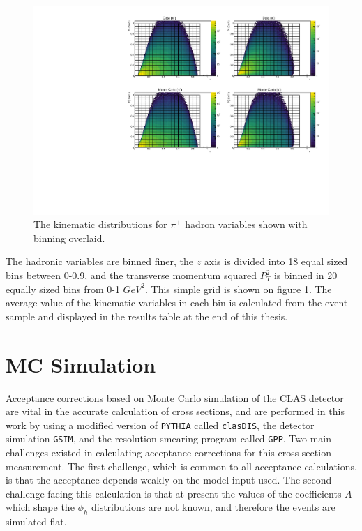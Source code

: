 \begin{figure}
  \centering
  \includegraphics[width=\textwidth]{image/plots/sidis/zpt.pdf}
  \caption[Kinematic distributions and binning for hadron variables.]{The kinematic distributions for $\pi^{\pm}$ hadron variables shown with binning overlaid.}
    \label{fig:kinematics_zpt}

\end{figure}

The hadronic variables are binned finer, the $z$ axis is divided into 18 equal sized bins between 0-0.9, and the transverse momentum squared $P_T^2$ is binned in 20 equally sized bins from 0-1 $GeV^2$.  This simple grid is shown on figure \ref{fig:kinematics_zpt}.  The average value of the kinematic variables in each bin is calculated from the event sample and displayed in the results table at the end of this thesis.

\section{MC Simulation}
Acceptance corrections based on Monte Carlo simulation of the CLAS detector are vital in the accurate calculation of cross sections, and are performed in this work by using a modified version of \texttt{PYTHIA} called \texttt{clasDIS}, the detector simulation \texttt{GSIM}, and the resolution smearing program called \texttt{GPP}.  Two main challenges existed in calculating acceptance corrections for this cross section measurement.  The first challenge, which is common to all acceptance calculations, is that the acceptance depends weakly on the model input used.  The second challenge facing this calculation is that at present the values of the coefficients $A$ which shape the $\phi_h$ distributions are not known, and therefore the events are simulated flat.  \\  

